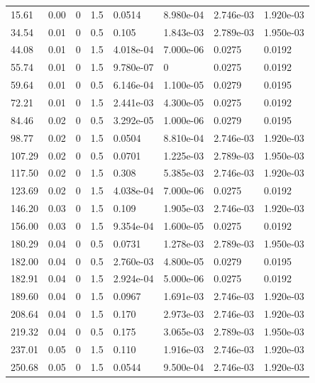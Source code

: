 \documentclass[preview]{standalone}
\begin{document}
{{\begin{tabular}{L{1.2cm}C{1.2cm} C{0.3cm}C{0.5cm} C{1.4cm}C{1.4cm} C{1.4cm}C{1.4cm}}
  15.61  &  0.00  & 0     & 1.5 &  0.0514  & 8.980e-04  & 2.746e-03 &  1.920e-03   \\ 
  34.54  &  0.01  & 0     & 0.5 &  0.105  & 1.843e-03  & 2.789e-03 &  1.950e-03   \\ 
  44.08  &  0.01  & 0     & 1.5 &  4.018e-04  & 7.000e-06  & 0.0275 &  0.0192   \\ 
  55.74  &  0.01  & 0     & 1.5 &  9.780e-07  & 0  & 0.0275 &  0.0192   \\ 
  59.64  &  0.01  & 0     & 0.5 &  6.146e-04  & 1.100e-05  & 0.0279 &  0.0195   \\ 
  72.21  &  0.01  & 0     & 1.5 &  2.441e-03  & 4.300e-05  & 0.0275 &  0.0192   \\ 
  84.46  &  0.02  & 0     & 0.5 &  3.292e-05  & 1.000e-06  & 0.0279 &  0.0195   \\ 
  98.77  &  0.02  & 0     & 1.5 &  0.0504  & 8.810e-04  & 2.746e-03 &  1.920e-03   \\ 
  107.29  &  0.02  & 0     & 0.5 &  0.0701  & 1.225e-03  & 2.789e-03 &  1.950e-03   \\ 
  117.50  &  0.02  & 0     & 1.5 &  0.308  & 5.385e-03  & 2.746e-03 &  1.920e-03   \\ 
  123.69  &  0.02  & 0     & 1.5 &  4.038e-04  & 7.000e-06  & 0.0275 &  0.0192   \\ 
  146.20  &  0.03  & 0     & 1.5 &  0.109  & 1.905e-03  & 2.746e-03 &  1.920e-03   \\ 
  156.00  &  0.03  & 0     & 1.5 &  9.354e-04  & 1.600e-05  & 0.0275 &  0.0192   \\ 
  180.29  &  0.04  & 0     & 0.5 &  0.0731  & 1.278e-03  & 2.789e-03 &  1.950e-03   \\ 
  182.00  &  0.04  & 0     & 0.5 &  2.760e-03  & 4.800e-05  & 0.0279 &  0.0195   \\ 
  182.91  &  0.04  & 0     & 1.5 &  2.924e-04  & 5.000e-06  & 0.0275 &  0.0192   \\ 
  189.60  &  0.04  & 0     & 1.5 &  0.0967  & 1.691e-03  & 2.746e-03 &  1.920e-03   \\ 
  208.64  &  0.04  & 0     & 1.5 &  0.170  & 2.973e-03  & 2.746e-03 &  1.920e-03   \\ 
  219.32  &  0.04  & 0     & 0.5 &  0.175  & 3.065e-03  & 2.789e-03 &  1.950e-03   \\ 
  237.01  &  0.05  & 0     & 1.5 &  0.110  & 1.916e-03  & 2.746e-03 &  1.920e-03   \\ 
  250.68  &  0.05  & 0     & 1.5 &  0.0544  & 9.500e-04  & 2.746e-03 &  1.920e-03   \\ 

\end{tabular}}}
\end{document}

